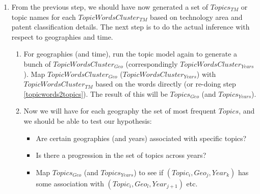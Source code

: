 \documentclass[11pt]{article}
\begin{document}
\begin{enumerate}
\item From the previous step, we should have now generated a set of $Topics_{TM}$ or topic names for each $TopicWordsCluster_{TM}$ based on technology area and patent classification details. The next step is to do the actual inference with respect to geographies and time.
\begin{enumerate}
\item For geographies (and time), run the topic model again to generate a bunch of $TopicWordsCluster_{Geo}$ (correspondingly $TopicWordsCluster_{Years}$). Map $TopicWordsCluster_{Geo}$ ($TopicWordsCluster_{Years}$) with $TopicWordsCluster_{TM}$ based on the words directly (or re-doing step \ref{topicwords2topics}). The result of this will be $Topics_{Geo}$ (and $Topics_{Years}$).
\item Now we will have for each geography the set of most frequent $Topics$, and we should be able to test our hypothesis:
\begin{itemize}
\item Are certain geographies (and years) associated with specific topics? 
\item Is there a progression in the set of topics across years?
\item Map $Topics_{Geo}$ (and $Topics_{Years}$) to see if $(Topic_i, Geo_j, Year_k)$ has some association with $(Topic_i, Geo_l, Year_{j+1})$ etc.
\end{itemize}
\end{enumerate}
\end{enumerate}

\end{document}
